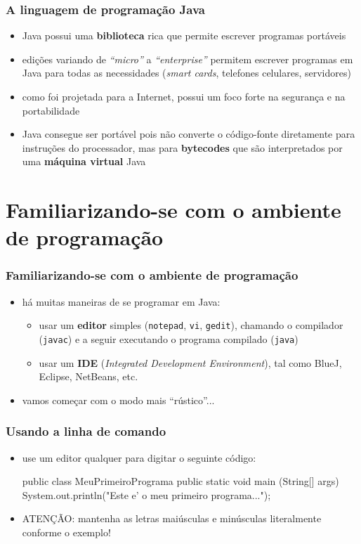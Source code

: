 \documentclass[aspectratio=169]{beamer}
\begin{document}
\begin{frame}\frametitle{A linguagem de programação Java}
\begin{itemize}
	\item Java possui uma \textbf{biblioteca} rica que permite escrever programas portáveis
	\item edições variando de \emph{``micro''} a \emph{``enterprise''} permitem escrever programas em Java para todas as necessidades (\emph{smart cards}, telefones celulares, servidores)
	\item como foi projetada para a Internet, possui um foco forte na segurança e na portabilidade
	\item Java consegue ser portável pois não converte o código-fonte diretamente para instruções do processador, mas para \textbf{bytecodes} que são interpretados por uma \textbf{máquina virtual} Java
\end{itemize}
\end{frame}

\section{Familiarizando-se com o ambiente de programação}

\begin{frame}\frametitle{Familiarizando-se com o ambiente de programação}
\begin{itemize}
	\item há muitas maneiras de se programar em Java:
	\begin{itemize}
		\item usar um \textbf{editor} simples (\texttt{notepad}, \texttt{vi}, \texttt{gedit}), chamando o compilador (\texttt{javac}) e a seguir executando o programa compilado (\texttt{java})
		\item usar um \textbf{IDE} (\emph{Integrated Development Environment}), tal como BlueJ, Eclipse, NetBeans, etc.
	\end{itemize}
	\item vamos começar com o modo mais ``rústico''...
\end{itemize}
\end{frame}

\begin{frame}[fragile]\frametitle{Usando a linha de comando}
\begin{itemize}
	\item use um editor qualquer para digitar o seguinte código:
\begin{javacode}
public class MeuPrimeiroPrograma {
  public static void main (String[] args) {
    System.out.println("Este e' o meu primeiro programa...");
  }
}
\end{javacode}
	\item ATENÇÃO: mantenha as letras maiúsculas e minúsculas literalmente conforme o exemplo!
\end{itemize}
\end{frame}
\end{document}
